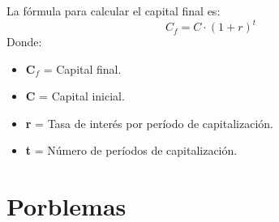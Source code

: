 \documentclass[11pt]{article}
\begin{document}
La fórmula para calcular el capital final es:
\begin{equation*}
C_f = C \cdot (1 + r)^t
\end{equation*}
Donde:
\begin{itemize}
    \item \textbf{C$_f$} = Capital final.
    \item \textbf{C} = Capital inicial.
    \item \textbf{r} = Tasa de interés por período de capitalización.
    \item \textbf{t} = Número de períodos de capitalización.
\end{itemize}


\section{Porblemas}
\end{document}
